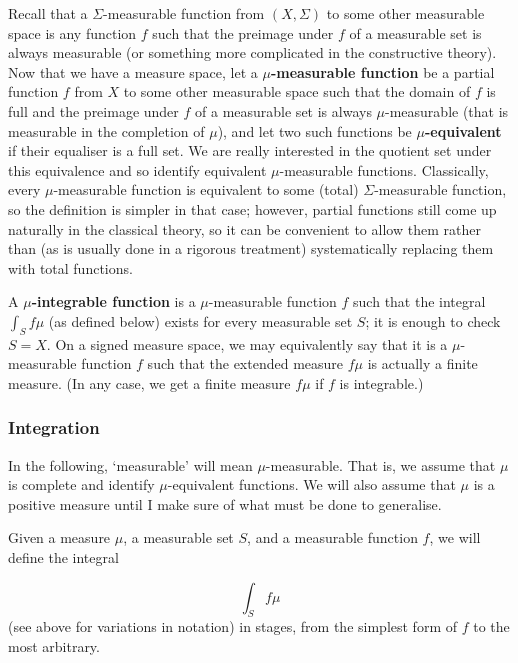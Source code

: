 \documentclass[preprint, 5p, 10pt]{elsarticle}
\theoremstyle{plain}
\begin{document}
Recall that a $\Sigma$-measurable function from $(X,\Sigma)$ to some other measurable space is any function $f$ such that the preimage under $f$ of a measurable set is always measurable (or something more complicated in the constructive theory). Now that we have a measure space, let a \textbf{$\mu$-measurable function} be a partial function $f$ from $X$ to some other measurable space such that the domain of $f$ is full and the preimage under $f$ of a measurable set is always $\mu$-measurable (that is measurable in the completion of $\mu$), and let two such functions be \textbf{$\mu$-equivalent} if their equaliser is a full set. We are really interested in the quotient set under this equivalence and so identify equivalent $\mu$-measurable functions. Classically, every $\mu$-measurable function is equivalent to some (total) $\Sigma$-measurable function, so the definition is simpler in that case; however, partial functions still come up naturally in the classical theory, so it can be convenient to allow them rather than (as is usually done in a rigorous treatment) systematically replacing them with total functions.

A \textbf{$\mu$-integrable function} is a $\mu$-measurable function $f$ such that the integral $\int_S f \mu$ (as defined below) exists for every measurable set $S$; it is enough to check $S = X$. On a signed measure space, we may equivalently say that it is a $\mu$-measurable function $f$ such that the extended measure $f \mu$ is actually a finite measure. (In any case, we get a finite measure $f \mu$ if $f$ is integrable.)

\hypertarget{integration_10}{}\subsubsection*{{Integration}}\label{integration_10}

In the following, `{}measurable'{} will mean $\mu$-measurable. That is, we assume that $\mu$ is complete and identify $\mu$-equivalent functions. We will also assume that $\mu$ is a positive measure until I make sure of what must be done to generalise.

Given a measure $\mu$, a measurable set $S$, and a measurable function $f$, we will define the integral

\begin{displaymath}
\int_S f \mu
\end{displaymath}
(see above for variations in notation) in stages, from the simplest form of $f$ to the most arbitrary.
\end{document}
